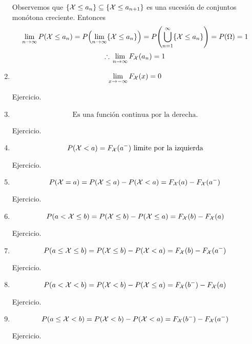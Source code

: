 \begin{enumerate}
\begin{myproof}
      Observemos que $\{\mathcal{X} \le a_n\} \subseteq \{\mathcal{X} \le a_{n+1}\}$ es una sucesión de conjuntos monótona creciente. Entonces
      \[\lim_{n\to \infty} P(\mcX \le a_n) = P\parens*{\lim_{n\to \infty}\{\mcX \le a_n\}} = P\parens*{\bigcup_{n=1}^{\infty} \{\mcX \le a_n\}} = P(\Omega) = 1 \]
      \[\therefore \, \lim_{n\to \infty}F_{\mathcal{X}}(a_n) = 1\]
    \end{myproof}
  \item \[ \lim_{x \to -\infty} F_{\mathcal{X}}(x) = 0\]
    \begin{myproof}
      Ejercicio.
    \end{myproof}
  \item $$\text{Es una función continua por la derecha.}$$
    \begin{myproof}
      Ejercicio.
    \end{myproof}
  \item \[ P(\mathcal X < a) = F_{\mathcal{X}}(a^-) \text{ limite por la izquierda}\]
    \begin{myproof}
      Ejercicio.
    \end{myproof}
  \item \[ P(\mathcal X = a) = P(\mathcal X \le a) - P(\mathcal X < a) = F_{\mathcal{X}}(a) - F_{\mathcal{X}}(a^-) \]
    \begin{myproof}
      Ejercicio.
    \end{myproof}
  \item \[ P(a< \mathcal X \le b) = P(\mathcal X \le b) - P(\mathcal X \le a) = F_{\mathcal{X}}(b) - F_{\mathcal{X}}(a) \]
    \begin{myproof}
      Ejercicio.
    \end{myproof}
  \item \[ P(a \le \mathcal X \le b) = P(\mathcal X \le b) - P(\mathcal X < a) = F_{\mathcal{X}}(b) - F_{\mathcal{X}}(a^-) \]
    \begin{myproof}
      Ejercicio.
    \end{myproof}
  \item \[ P(a < \mathcal X < b) = P(\mathcal X < b) - P(\mathcal X \le a) = F_{\mathcal{X}}(b^-) - F_{\mathcal{X}}(a) \]
    \begin{myproof}
      Ejercicio.
    \end{myproof}
  \item \[ P(a \le \mathcal X < b) = P(\mathcal X < b) - P(\mathcal X < a) = F_{\mathcal{X}}(b^-) - F_{\mathcal{X}}(a^-) \]
    \begin{myproof}
      Ejercicio.
    \end{myproof}
\end{enumerate}

